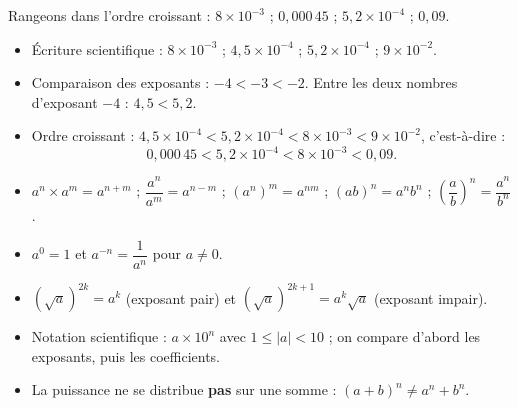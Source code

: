 \documentclass[11pt]{article}
\begin{document}
\begin{exemplebox}
Rangeons dans l'ordre croissant : $8 \times 10^{-3}$ ; $0,000\,45$ ; $5,2 \times 10^{-4}$ ; $0,09$.
\begin{itemize}
    \item Écriture scientifique : $8 \times 10^{-3}$ ; $4,5 \times 10^{-4}$ ; $5,2 \times 10^{-4}$ ; $9 \times 10^{-2}$.
    \item Comparaison des exposants : $-4 < -3 < -2$. Entre les deux nombres d'exposant $-4$ : $4,5 < 5,2$.
    \item Ordre croissant : $4,5 \times 10^{-4} < 5,2 \times 10^{-4} < 8 \times 10^{-3} < 9 \times 10^{-2}$, c'est-à-dire :
    \[ 0,000\,45 < 5,2 \times 10^{-4} < 8 \times 10^{-3} < 0,09. \]
\end{itemize}
\end{exemplebox}

\begin{aretenir}
\begin{itemize}
    \item $a^n \times a^m = a^{n+m}$ ; $\dfrac{a^n}{a^m} = a^{n-m}$ ; $(a^n)^m = a^{nm}$ ; $(ab)^n = a^n b^n$ ; $\left(\dfrac{a}{b}\right)^n = \dfrac{a^n}{b^n}$.
    \item $a^0 = 1$ et $a^{-n} = \dfrac{1}{a^n}$ pour $a \neq 0$.
    \item $(\sqrt{a})^{2k} = a^k$ (exposant pair) et $(\sqrt{a})^{2k+1} = a^k\sqrt{a}$ (exposant impair).
    \item Notation scientifique : $a \times 10^n$ avec $1 \le |a| < 10$ ; on compare d'abord les exposants, puis les coefficients.
    \item La puissance ne se distribue \textbf{pas} sur une somme : $(a+b)^n \neq a^n + b^n$.
\end{itemize}
\end{aretenir}
\end{document}
